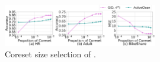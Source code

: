 

\begin{figure}
	\vspace{-1em}
	\centering
	\includegraphics[width=0.6\textwidth]{figs/e2e}
	\caption{ Coreset size selection of \ours.}
	\label{fig:e2e}
\end{figure}





